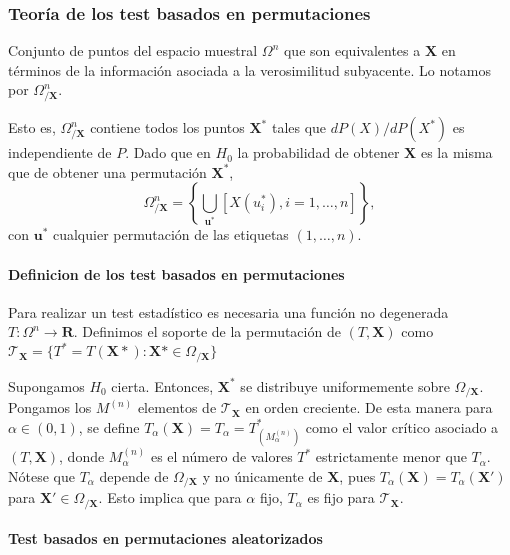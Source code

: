 \subsubsection{Teoría de los test basados en permutaciones}

\begin{definicion}
	Conjunto de puntos del espacio muestral $\Omega^n$ que son equivalentes a $\mathbf{X}$ en términos de la información asociada a la verosimilitud subyacente. Lo notamos por $\Omega^n_{/\mathbf{X}}$.
\end{definicion}

	Esto es, $\Omega^n_{/\mathbf{X}}$ contiene todos los puntos $\mathbf{X}^*$ tales que $dP(X)/dP(X^*)$ es independiente de $P$. Dado que en $H_0$ la probabilidad de obtener $\mathbf{X}$ es la misma que de obtener una permutación $\mathbf{X}^*$,
	\[ 
		\Omega^n_{/\mathbf{X}} = 
			\left\lbrace
				\underset{\mathbf{u}^*}{\bigcup}
					[ X(u_i^*), i = 1, \dots, n ]
			\right\rbrace ,
	\]
	con $\mathbf{u}^*$ cualquier permutación de las etiquetas $(1, \dots, n)$.

\paragraph{Definicion de los test basados en permutaciones}
\begin{definicion}
	Para realizar un test estadístico es necesaria una función no degenerada $T: \Omega^n \rightarrow \mathbf{R}$. Definimos el soporte de la permutación de $(T, \mathbf{X})$ como $\mathcal{T}_\mathbf{X} = \{ T^* = T(\mathbf{X}*): \mathbf{X}* \in \Omega_{/\mathbf{X}}\}$ 
\end{definicion}	

	Supongamos $H_0$ cierta. Entonces, $\mathbf{X}^*$ se distribuye uniformemente sobre $\Omega_{/\mathbf{X}}$. Pongamos los $M^{(n)}$ elementos de $\mathcal{T}_\mathbf{X}$ en orden creciente. De esta manera para $\alpha \in (0,1)$, se define $T_\alpha(\mathbf{X}) = T_\alpha = T^*_{(M^{(n)}_\alpha)}$ como el valor crítico asociado a $(T, \mathbf{X})$, donde $M^{(n)}_\alpha$ es el número de valores $T^*$ estrictamente menor que $T_\alpha$. Nótese que $T_\alpha$ depende de $\Omega_{/\mathbf{X}}$ y no únicamente de $\mathbf{X}$, pues $T_\alpha(\mathbf{X}) = T_\alpha(\mathbf{X}')$ para $\mathbf{X}' \in \Omega_{/\mathbf{X}}$. Esto implica que para $\alpha$ fijo, $T_\alpha$ es fijo para $\mathcal{T}_\mathbf{X}$.
	
\paragraph{Test basados en permutaciones aleatorizados}

